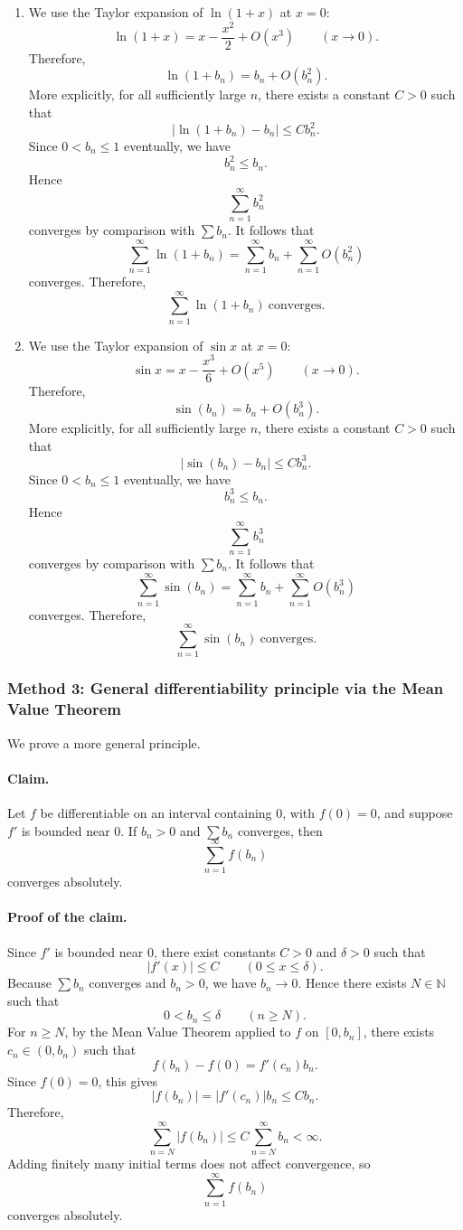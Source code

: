 \documentclass[12pt]{article}
\begin{document}
\begin{enumerate}[label=(\roman*)]
\item We use the Taylor expansion of \(\ln(1+x)\) at \(x=0\):
\[
\ln(1+x)=x-\frac{x^2}{2}+O(x^3)\qquad (x\to 0).
\]
Therefore,
\[
\ln(1+b_n)=b_n+O(b_n^2).
\]
More explicitly, for all sufficiently large \(n\), there exists a constant \(C>0\) such that
\[
\left|\ln(1+b_n)-b_n\right|\le Cb_n^2.
\]
Since \(0<b_n\le 1\) eventually, we have
\[
b_n^2\le b_n.
\]
Hence
\[
\sum_{n=1}^{\infty}b_n^2
\]
converges by comparison with \(\sum b_n\). It follows that
\[
\sum_{n=1}^{\infty}\ln(1+b_n)
=
\sum_{n=1}^{\infty}b_n
+
\sum_{n=1}^{\infty}O(b_n^2)
\]
converges. Therefore,
\[
\boxed{\sum_{n=1}^{\infty}\ln(1+b_n)\ \text{converges}.}
\]

\item We use the Taylor expansion of \(\sin x\) at \(x=0\):
\[
\sin x=x-\frac{x^3}{6}+O(x^5)\qquad (x\to 0).
\]
Therefore,
\[
\sin(b_n)=b_n+O(b_n^3).
\]
More explicitly, for all sufficiently large \(n\), there exists a constant \(C>0\) such that
\[
\left|\sin(b_n)-b_n\right|\le Cb_n^3.
\]
Since \(0<b_n\le 1\) eventually, we have
\[
b_n^3\le b_n.
\]
Hence
\[
\sum_{n=1}^{\infty}b_n^3
\]
converges by comparison with \(\sum b_n\). It follows that
\[
\sum_{n=1}^{\infty}\sin(b_n)
=
\sum_{n=1}^{\infty}b_n
+
\sum_{n=1}^{\infty}O(b_n^3)
\]
converges. Therefore,
\[
\boxed{\sum_{n=1}^{\infty}\sin(b_n)\ \text{converges}.}
\]
\end{enumerate}

\newpage
\subsubsection*{Method 3: General differentiability principle via the Mean Value Theorem}
We prove a more general principle.

\paragraph{Claim.}
Let \(f\) be differentiable on an interval containing \(0\), with \(f(0)=0\), and suppose \(f'\) is bounded near \(0\). If \(b_n>0\) and \(\sum b_n\) converges, then
\[
\sum_{n=1}^{\infty}f(b_n)
\]
converges absolutely.

\paragraph{Proof of the claim.}
Since \(f'\) is bounded near \(0\), there exist constants \(C>0\) and \(\delta>0\) such that
\[
|f'(x)|\le C
\qquad
(0\le x\le \delta).
\]
Because \(\sum b_n\) converges and \(b_n>0\), we have \(b_n\to 0\). Hence there exists \(N\in\mathbb{N}\) such that
\[
0<b_n\le \delta
\qquad
(n\ge N).
\]
For \(n\ge N\), by the Mean Value Theorem applied to \(f\) on \([0,b_n]\), there exists \(c_n\in(0,b_n)\) such that
\[
f(b_n)-f(0)=f'(c_n)b_n.
\]
Since \(f(0)=0\), this gives
\[
|f(b_n)|=|f'(c_n)|b_n\le Cb_n.
\]
Therefore,
\[
\sum_{n=N}^{\infty}|f(b_n)|
\le
C\sum_{n=N}^{\infty}b_n
<\infty.
\]
Adding finitely many initial terms does not affect convergence, so
\[
\sum_{n=1}^{\infty}f(b_n)
\]
converges absolutely.
\end{document}
